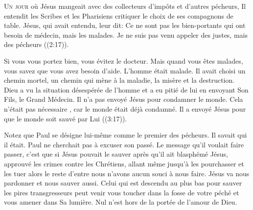 



\lettrine{U}{n jour} où Jésus mangeait avec des collecteurs d'impôts
 et d'autres pécheurs, Il entendit les Scribes et les Pharisiens
 critiquer le choix de ses compagnons de table.
 \Og Jésus, qui avait entendu, leur dit:
 Ce ne sont pas les bien-portants qui ont besoin de médecin,
 mais les malades. Je ne suis pas venu appeler des justes,
 mais des pécheurs \Fg{} 
 ((2:17)).


Si vous vous portez bien, vous évitez le docteur.
 Mais quand vous êtes malades, vous savez que vous avez besoin d'aide.
 L'homme était malade. Il avait choisi un chemin mortel,
 un chemin qui mène à la maladie, la misère et la destruction.
 Dieu a vu la situation désespérée de l'homme et a eu pitié de lui
 en envoyant Son Fils, le Grand Médecin.
 Il n'a pas envoyé Jésus pour condamner le monde.
 Cela n'était pas nécessaire ,
 car le monde était déjà condamné. Il a envoyé Jésus
 \Og pour que le monde soit sauvé par Lui \Fg{} 
 ((3:17)).

Notez que Paul se désigne lui-même comme le premier des pécheurs.
 Il savait qui il était. Paul ne cherchait pas à excuser son passé.
 Le message qu'il voulait faire passer, c'est que si Jésus pouvait le sauver
 \ocadr après qu'il ait blasphémé Jésus, approuvé les crimes
 contre les Chrétiens, allant même jusqu'à les pourchasser
 et les tuer \fcadr{} alors le reste d'entre nous n'avons aucun souci
 à nous faire. Jésus va nous pardonner et nous sauver aussi.
 Celui qui est descendu au plus bas pour sauver les pires transgresseurs
 peut venir vous toucher dans la fosse de votre péché
 et vous amener dans Sa lumière.
 Nul n'est hors de la portée de l'amour de Dieu.

\dvrule



